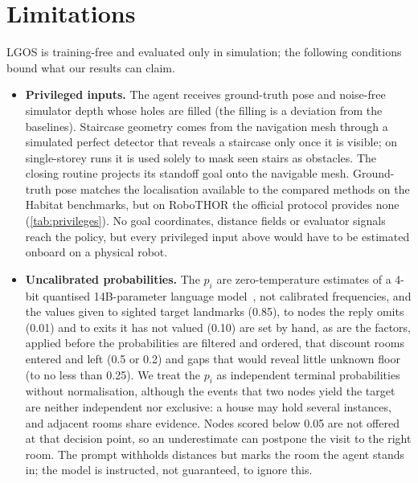 \documentclass[10pt]{article}
\newcommand{\ours}{LGOS\xspace}
\begin{document}
\section{Limitations}\label{sec:limitations}

\ours is training-free and evaluated only in simulation; the following conditions bound what our results can claim.

\begin{itemize}[leftmargin=*,itemsep=2pt]
\item \textbf{Privileged inputs.} The agent receives ground-truth pose and noise-free simulator depth whose holes are
filled (the filling is a deviation from the baselines). Staircase geometry comes from the navigation mesh through a
simulated perfect detector that reveals a staircase only once it is visible; on single-storey runs it is used solely to
mask seen stairs as obstacles. The closing routine projects its standoff goal onto the navigable mesh. Ground-truth pose
matches the localisation available to the compared methods on the Habitat benchmarks, but on RoboTHOR the official
protocol provides none (\cref{tab:privileges}). No goal coordinates, distance fields or evaluator signals reach the
policy, but every privileged input above would have to be estimated onboard on a physical robot.

\item \textbf{Uncalibrated probabilities.} The $p_i$ are zero-temperature estimates of a 4-bit quantised 14B-parameter
language model~\citep{yang2024qwen25}, not calibrated frequencies, and the values given to sighted target landmarks
(0.85), to nodes the reply omits (0.01) and to exits it has not valued (0.10) are set by hand, as are the factors,
applied before the probabilities are filtered and ordered, that discount rooms entered and left (0.5 or 0.2) and gaps
that would reveal little unknown floor (to no less than 0.25). We treat the $p_i$ as independent terminal probabilities
without normalisation, although the events that two nodes yield the target are neither independent nor exclusive: a
house may hold several instances, and adjacent rooms share evidence. Nodes scored below 0.05 are not offered at that
decision point, so an underestimate can postpone the visit to the right room. The prompt withholds distances but
marks the room the agent stands in; the model is instructed, not guaranteed, to ignore this.


\end{itemize}
\end{document}
